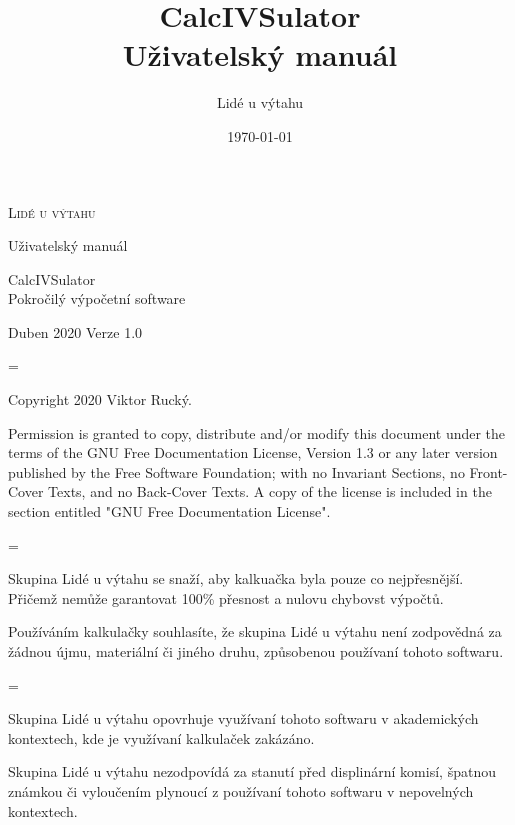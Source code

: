 \documentclass[a5paper,8pt,twoside]{extarticle}
\title{CalcIVSulator\\Uživatelský manuál}
\author{Lidé u výtahu}
\date{\today}
\newenvironment{warningBox}
  {\par\begin{mdframed}[linewidth=1pt,linecolor=black]%
    \begin{list}{}{\leftmargin=1cm
                   \labelwidth=\leftmargin}\item[\Large\warning]}
  {\end{list}\end{mdframed}\par}
\newenvironment{infoBox}
  {\par\begin{mdframed}[linewidth=1pt,linecolor=black]%
    \begin{list}{}{\leftmargin=1cm
                   \labelwidth=\leftmargin}\item[\Large\lefthand]}
  {\end{list}\end{mdframed}\par}
\newcommand*\joinBox{\vspace{-0.9em}}
\begin{document}
    \renewcommand\thesubsubsection{\Alph{subsubsection}}
    \setlength{\parindent}{0em}
    \setlength{\parskip}{1em}
    \begin{titlepage}
        \begin{center}
            {\LARGE \textsc{Lidé u výtahu}}

            {\large Uživatelský manuál}
            
            {\Huge CalcIVSulator}\\
            \vspace{1.5mm}
            {\huge Pokročilý výpočetní software}\\
        \end{center}
        {\large Duben 2020} \hfill {\large Verze 1.0}
    \end{titlepage}
    
    \thispagestyle{empty}
    \begin{infoBox}
            Copyright \textcopyright{} 2020 Viktor Rucký.

            \foreignlanguage{english}{Permission is granted to copy, distribute and/or modify this document
            under the terms of the GNU Free Documentation License, Version 1.3
            or any later version published by the Free Software Foundation;
            with no Invariant Sections, no Front-Cover Texts, and no Back-Cover Texts.
            A copy of the license is included in the section entitled "GNU
            Free Documentation License".}
    \end{infoBox}
    \joinBox
    \begin{warningBox}
        Skupina Lidé u výtahu se snaží, aby kalkuačka byla pouze co nejpřesnější. Přičemž nemůže garantovat 100\% přesnost a nulovu chybovst výpočtů.

        Používáním kalkulačky souhlasíte, že skupina Lidé u výtahu není zodpovědná za žádnou újmu, materiální či jiného druhu, způsobenou používaní tohoto softwaru.
    \end{warningBox}
    \joinBox
    \begin{warningBox}
        Skupina Lidé u výtahu opovrhuje využívaní tohoto softwaru v akademických kontextech, kde je využívaní kalkulaček zakázáno.

        Skupina Lidé u výtahu nezodpovídá za stanutí před displinární komisí, špatnou známkou či vyloučením plynoucí z používaní tohoto softwaru v nepovelných kontextech.
    \end{warningBox}
    
\end{document}
